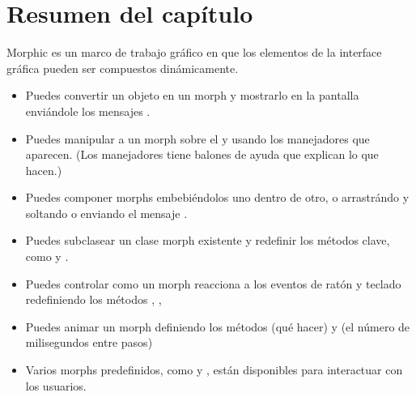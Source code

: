 \documentclass[a4paper,10pt,twoside]{book}
\begin{document}
\section{Resumen del cap\'itulo}

Morphic es un marco de trabajo gr\'afico en que los elementos de la interface gr\'afica pueden ser compuestos din\'amicamente.

\begin{itemize}
  \item Puedes convertir un objeto en un morph y mostrarlo en la pantalla envi\'andole los mensajes .
  \item Puedes manipular a un morph   sobre el y usando los manejadores que aparecen. (Los manejadores tiene balones de ayuda que explican lo que hacen.)
  \item Puedes componer morphs embebi\'endolos uno dentro de otro, o arrastr\'ando y soltando o enviando el mensaje .
  \item Puedes subclasear un clase morph existente y redefinir los m\'etodos clave, como  y .
  \item Puedes controlar como un morph reacciona a los eventos de rat\'on y teclado redefiniendo los m\'etodos , , \etc
  \item Puedes animar un morph definiendo los m\'etodos  (qu\'e hacer) y  (el n\'umero de milisegundos entre pasos)
  \item Varios morphs predefinidos, como  y , est\'an disponibles para interactuar con los usuarios.
\end{itemize}

\ifx\wholebook\relax\else
\end{document}
